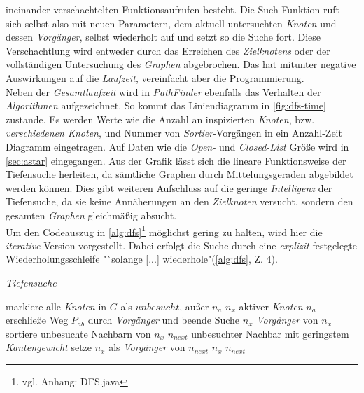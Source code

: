 \documentclass[12pt]{article}
\begin{document}
\noindent ineinander verschachtelten Funktionsaufrufen besteht. Die Such-Funktion ruft sich selbst also mit neuen Parametern, dem aktuell untersuchten \textit{Knoten} und dessen \textit{Vorgänger}, selbst wiederholt auf und setzt so die Suche fort. Diese Verschachtlung wird entweder durch das Erreichen des \textit{Zielknotens} oder der vollständigen Untersuchung des \textit{Graphen} abgebrochen. Das hat mitunter negative Auswirkungen auf die \textit{Laufzeit}, vereinfacht aber die Programmierung. 
\\
Neben der \textit{Gesamtlaufzeit} wird in \textit{PathFinder} ebenfalls das Verhalten der \textit{Algorithmen} aufgezeichnet. So kommt das Liniendiagramm in \autoref{fig:dfs-time} zustande. Es werden Werte wie die Anzahl an inspizierten \textit{Knoten}, bzw. \textit{verschiedenen Knoten}, und Nummer von \textit{Sortier}-Vorgängen in ein Anzahl-Zeit Diagramm eingetragen. Auf Daten wie die \textit{Open-} und \textit{Closed-List} Größe wird in \autoref{sec:astar} eingegangen. Aus der Grafik lässt sich die lineare Funktionsweise der Tiefensuche herleiten, da sämtliche Graphen durch Mittelungsgeraden abgebildet werden können. Dies gibt weiteren Aufschluss auf die geringe \textit{Intelligenz} der Tiefensuche, da sie keine Annäherungen an den \textit{Zielknoten} versucht, sondern den gesamten \textit{Graphen} gleichmäßig absucht.
\\
Um den Codeauszug in \autoref{alg:dfs}\footnote{vgl. Anhang: DFS.java} möglichst gering zu halten, wird hier die \textit{iterative} Version vorgestellt. Dabei erfolgt die Suche durch eine \textit{explizit} festgelegte Wiederholungsschleife "`solange [...] wiederhole"(\autoref{alg:dfs}, Z. 4). 
\begin{algorithm}
\caption{\textit{Tiefensuche} \label{alg:dfs}}
\begin{algorithmic}[1]
\Statex
{}
\Statex
{}
	\State markiere alle \textit{Knoten} in $G$ als $unbesucht$, außer $n_a$
	\State \sei $n_x$ aktiver \textit{Knoten} $n_a$
			\State erschließe Weg $P_{ab}$ durch \textit{Vorgänger} und beende Suche
		\EndIf
			\State \sei $n_x$ \textit{Vorgänger} von $n_x$
		\Else
			\State sortiere unbesuchte Nachbarn von $n_x$
			\State \sei $n_{next}$ unbesuchter Nachbar mit geringstem \textit{Kantengewicht}
			\State setze $n_x$ als \textit{Vorgänger} von $n_{next}$
			\State \sei $n_x$ $n_{next}$
		\EndIf
	\EndWhile
\EndProcedure
\end{algorithmic}
\end{algorithm}
\end{document}
